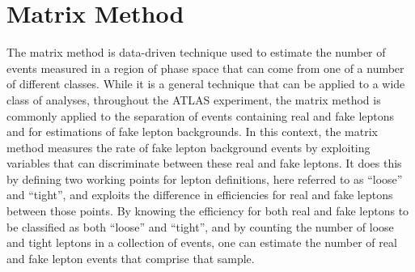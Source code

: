 
\chapter{Matrix Method}
\label{app:matrixmethod}

The matrix method is data-driven technique used to estimate the number of events measured in a region of phase space that can come from one of a number of different classes.
While it is a general technique that can be applied to a wide class of analyses, throughout the ATLAS experiment,
the matrix method is commonly applied to the separation of events containing real and fake leptons
and for estimations of fake lepton backgrounds. %
In this context, the matrix method measures the rate of fake lepton background events by exploiting variables that can discriminate
between these real and fake leptons.
It does this by defining two working points for lepton definitions, here referred to as ``loose'' and ``tight'',
and exploits the difference in efficiencies for real and fake leptons between those points.
By knowing the efficiency for both real and fake leptons to be classified as both ``loose'' and ``tight'',
and by counting the number of loose and tight leptons in a collection of events,
one can estimate the number of real and fake lepton events that comprise that sample.




